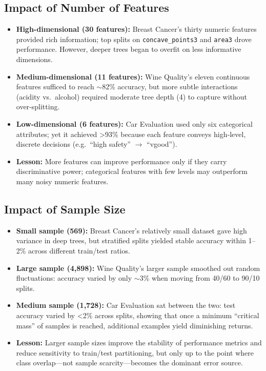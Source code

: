 \subsection{Impact of Number of Features}
\begin{itemize}
	\item \textbf{High-dimensional (30 features):} Breast Cancer’s thirty numeric features provided rich information; top splits on \texttt{concave\_points3} and \texttt{area3} drove performance. However, deeper trees began to overfit on less informative dimensions.
	\item \textbf{Medium-dimensional (11 features):} Wine Quality’s eleven continuous features sufficed to reach $\sim$82\% accuracy, but more subtle interactions (acidity vs.\ alcohol) required moderate tree depth (4) to capture without over‑splitting.
	\item \textbf{Low-dimensional (6 features):} Car Evaluation used only six categorical attributes; yet it achieved >93\% because each feature conveys high‑level, discrete decisions (e.g.\ “high safety” $\to$ “vgood”).
	\item \textbf{Lesson:} More features can improve performance only if they carry discriminative power; categorical features with few levels may outperform many noisy numeric features.
\end{itemize}

\subsection{Impact of Sample Size}
\begin{itemize}
	\item \textbf{Small sample (569):} Breast Cancer’s relatively small dataset gave high variance in deep trees, but stratified splits yielded stable accuracy within 1–2\% across different train/test ratios.
	\item \textbf{Large sample (4,898):} Wine Quality’s larger sample smoothed out random fluctuations: accuracy varied by only $\sim$3\% when moving from 40/60 to 90/10 splits.
	\item \textbf{Medium sample (1,728):} Car Evaluation sat between the two: test accuracy varied by <2\% across splits, showing that once a minimum “critical mass” of samples is reached, additional examples yield diminishing returns.
	\item \textbf{Lesson:} Larger sample sizes improve the stability of performance metrics and reduce sensitivity to train/test partitioning, but only up to the point where class overlap—not sample scarcity—becomes the dominant error source.
\end{itemize}

